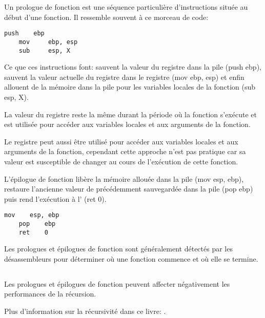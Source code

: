 \label{sec:prologepilog}

Un prologue de fonction est une séquence particulière d'instructions située au début d'une fonction. Il ressemble souvent à ce morceau de code:

\begin{lstlisting}[style=customasmx86]
    push    ebp
    mov     ebp, esp
    sub     esp, X
\end{lstlisting}

Ce que ces instructions font: sauvent la valeur du registre \EBP dans la pile (push ebp), sauvent la valeur actuelle du registre \ESP dans le
 registre \EBP (mov ebp, esp) et enfin allouent de la mémoire dans la pile pour les variables locales de la fonction (sub esp, X).

La valeur du registre \EBP reste la même durant la période où la fonction s'exécute et est utilisée pour accéder aux variables locales et aux arguments de la fonction.

Le registre \ESP peut aussi être utilisé pour accéder aux variables locales et aux arguments de la fonction, cependant cette approche n'est
 pas pratique car sa valeur est susceptible de changer au cours de l'exécution de cette fonction.

L'épilogue de fonction libère la mémoire allouée dans la pile (mov esp, ebp), restaure l'ancienne valeur de \EBP précédemment sauvegardée dans la pile (pop ebp) puis rend l'exécution à l' (ret 0).

\begin{lstlisting}[style=customasmx86]
    mov    esp, ebp
    pop    ebp
    ret    0
\end{lstlisting}

Les prologues et épilogues de fonction sont généralement détectés par les désassembleurs pour déterminer où une fonction commence et où elle se termine.

\subsection{\Recursion}

\myindex{\Recursion}
Les prologues et épilogues de fonction peuvent affecter négativement les performances de la récursion.

Plus d'information sur la récursivité dans ce livre: .

